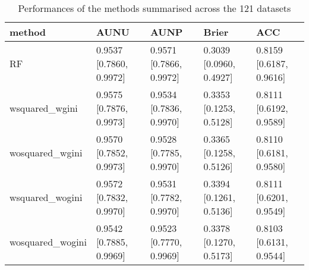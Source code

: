 \begin{table}[ht]
\centering
\begin{tabular}{lllll}
  \hline
method & AUNU & AUNP & Brier & ACC \\ 
  \hline
RF & 0.9537 [0.7860, 0.9972] & 0.9571 [0.7866, 0.9972] & 0.3039 [0.0960, 0.4927] & 0.8159 [0.6187, 0.9616] \\ 
  wsquared\_wgini & 0.9575 [0.7876, 0.9973] & 0.9534 [0.7836, 0.9970] & 0.3353 [0.1253, 0.5128] & 0.8111 [0.6192, 0.9589] \\ 
  wosquared\_wgini & 0.9570 [0.7852, 0.9973] & 0.9528 [0.7785, 0.9970] & 0.3365 [0.1258, 0.5126] & 0.8110 [0.6181, 0.9580] \\ 
  wsquared\_wogini & 0.9572 [0.7832, 0.9970] & 0.9531 [0.7782, 0.9970] & 0.3394 [0.1261, 0.5136] & 0.8111 [0.6201, 0.9549] \\ 
  wosquared\_wogini & 0.9542 [0.7885, 0.9969] & 0.9523 [0.7770, 0.9969] & 0.3378 [0.1270, 0.5173] & 0.8103 [0.6131, 0.9544] \\ 
   \hline
\end{tabular}
\caption{Performances of the methods summarised across the 121 datasets} 
\label{tab:benchmark_summary}
\end{table}
